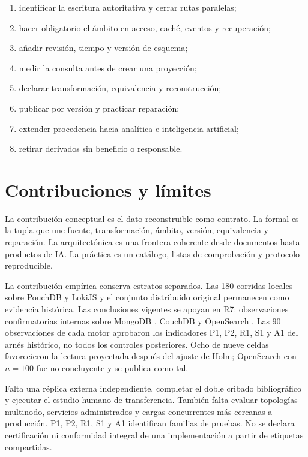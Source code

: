 \begin{enumerate}[leftmargin=*]
  \item identificar la escritura autoritativa y cerrar rutas paralelas;
  \item hacer obligatorio el ámbito en acceso, caché, eventos y recuperación;
  \item añadir revisión, tiempo y versión de esquema;
  \item medir la consulta antes de crear una proyección;
  \item declarar transformación, equivalencia y reconstrucción;
  \item publicar por versión y practicar reparación;
  \item extender procedencia hacia analítica e inteligencia artificial;
  \item retirar derivados sin beneficio o responsable.
\end{enumerate}

\chapter{Contribuciones y límites}

La contribución conceptual es el dato reconstruible como contrato. La formal es la tupla
que une fuente, transformación, ámbito, versión, equivalencia y reparación. La
arquitectónica es una frontera coherente desde documentos hasta productos de IA. La
práctica es un catálogo, listas de comprobación y protocolo reproducible.

La contribución empírica conserva estratos separados. Las 180 corridas locales sobre
PouchDB y LokiJS y el conjunto distribuido original permanecen como evidencia histórica.
Las conclusiones vigentes se apoyan en R7: \COBRIARSevenObservations{} observaciones
confirmatorias internas sobre MongoDB \COBRIARSevenMongoVersion, CouchDB
\COBRIARSevenCouchVersion{} y OpenSearch \COBRIARSevenOpenSearchVersion. Las 90
observaciones de cada motor aprobaron los indicadores P1, P2, R1, S1 y A1 del arnés
histórico, no todos los controles posteriores. Ocho de nueve celdas
favorecieron la lectura proyectada después del ajuste de Holm; OpenSearch con $n=100$
fue no concluyente y se publica como tal.

Falta una réplica externa independiente, completar el doble cribado bibliográfico y
ejecutar el estudio humano de transferencia. También falta evaluar topologías multinodo,
servicios administrados y cargas concurrentes más cercanas a producción. P1, P2, R1,
S1 y A1 identifican familias de pruebas. No se declara certificación ni conformidad
integral de una implementación a partir de etiquetas compartidas.

